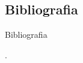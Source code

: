 \documentclass[10pt]{beamer}
\begin{document}
	\subsection{Bibliografia}\label{subsec:Bibliografia}
	\begin{frame}[allowframebreaks]{Bibliografia}
		
		.
	\end{frame}
\end{document}
